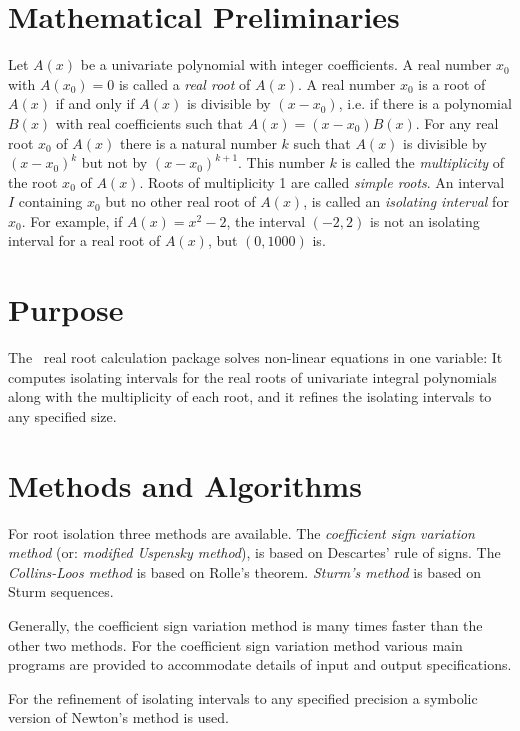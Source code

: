 \section{Mathematical Preliminaries}

Let $A(x)$ be a univariate polynomial with integer coefficients.
%
A real number $x_0$ with $A(x_0) = 0$ is called a
{\em real root} of $A(x)$.
%
A real number $x_0$ is a root of $A(x)$ if and only if
$A(x)$ is divisible by $(x-x_0)$, i.e. if
there is a polynomial $B(x)$ with real coefficients such that $A(x) = (x-x_0)B(x)$.
%
For any real root $x_0$ of $A(x)$ there is a natural number $k$
such that $A(x)$ is divisible by $(x-x_0)^k$ but not by $(x-x_0)^{k+1}$.
%
This number $k$ is called the {\em multiplicity} of the root $x_0$ of $A(x)$.
%
Roots of multiplicity 1 are called {\em simple roots}.
%
An interval $I$ containing $x_0$ but no other real root of $A(x)$,
is called an {\em isolating interval} for $x_0$.
%
For example, if $A(x) = x^2 - 2$, the interval $(-2,2)$ is not
an isolating interval for a real root of $A(x)$, but $(0,1000)$ is.


\section{Purpose}

The \saclib\ real root calculation package solves non-linear equations in one
variable:
%
It computes isolating intervals for the real roots of univariate integral
polynomials along with the multiplicity of each root, and it
refines the isolating intervals to any specified size.


\section{Methods and Algorithms}

For root isolation three methods are available.
%
The {\em coefficient sign variation method} (or: {\em modified Uspensky method}),
is based on Descartes' rule of signs.
%
The {\em Collins-Loos method} is based on Rolle's theorem.
%
{\em Sturm's method} is based on Sturm sequences.

Generally, the coefficient sign variation method is many times faster
than the other two methods.
For the coefficient sign variation method
various main programs are provided to accommodate details of input and
output specifications.

For the refinement of isolating intervals to any specified precision
a symbolic version of Newton's method is used.

